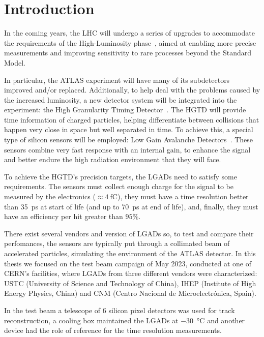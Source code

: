 
\chapter*{Introduction}\label{chap:intro}

In the coming years, the LHC will undergo a series of upgrades to accommodate the requirements of the High-Luminosity phase~\cite{cernHLLHCProject}, aimed at enabling more precise measurements and improving sensitivity to rare processes beyond the Standard Model.

In particular, the ATLAS experiment will have many of its subdetectors improved and/or replaced. Additionally, to help deal with the problems caused by the increased luminosity, a new detector system will be integrated into the experiment: the High Granularity Timing Detector~\cite{cernTechnicalDesign}. The HGTD will provide time information of charged particles, helping differentiate between collisions that happen very close in space but well separated in time. To achieve this, a special type of silicon sensors will be employed: Low Gain Avalanche Detectors~\cite{PELLEGRINI201412}. These sensors combine very fast response with an internal gain, to enhance the signal and better endure the high radiation environment that they will face.

To achieve the HGTD's precision targets, the LGADs need to satisfy some requirements. The sensors must collect enough charge for the signal to be measured by the electronics (\(\approx \qty{4}{\femto\coulomb} \)), they must have a time resolution better than \qty{35}{\pico\second} at start of life (and up to \qty{70}{\pico\second} at end of life), and, finally, they must have an efficiency per hit greater than \(95\%\).

There exist several vendors and version of LGADs so, to test and compare their perfomances, the sensors are typically put through a collimated beam of accelerated particles, simulating the environment of the ATLAS detector. In this thesis we focused on the test beam campaign of May 2023, conducted at one of CERN's facilities, where LGADs from three different vendors were characterized: USTC (University of Science and Technology of China), IHEP (Institute of High Energy Physics, China) and CNM (Centro Nacional de Microelectr\'onica, Spain).

In the test beam a telescope of 6 silicon pixel detectors was used for track reconstruction, a cooling box maintained the LGADs at \qty{-30}{\degreeCelsius} and another device had the role of reference for the time resolution measurements. 

